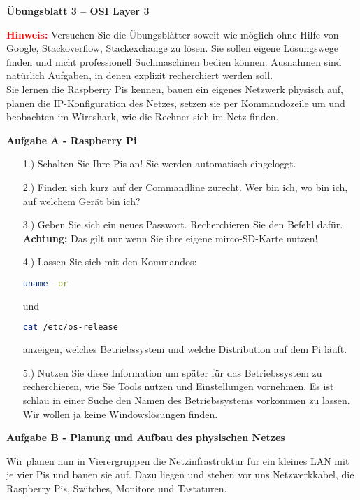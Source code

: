 \documentclass[paper=a4,fontsize=11pt]{scrartcl}%
\numberwithin{equation}{section}
\begin{document}
\begin{center} \Large{\textbf{Übungsblatt 3 -- OSI Layer 3}}\end{center}
\large{\textbf{\textcolor{red}{Hinweis:}}} Versuchen Sie die Übungsblätter soweit wie möglich ohne Hilfe von Google, Stackoverflow, Stackexchange zu lösen. Sie sollen eigene Lösungswege finden und nicht professionell Suchmaschinen bedien können. Ausnahmen sind natürlich Aufgaben, in denen explizit recherchiert werden soll.\\
Sie lernen die Raspberry Pis kennen, bauen ein eigenes Netzwerk physisch auf, planen die IP-Konfiguration des Netzes, setzen sie per Kommandozeile um und beobachten im Wireshark, wie die Rechner sich im Netz finden.
\vskip0.5in

\begin{center}\Large{\textbf{Aufgabe A - Raspberry Pi}}\end{center}\vskip0.25in

\begin{itemize}
	\item[1.)] Schalten Sie Ihre Pis an! Sie werden automatisch eingeloggt.
	\item[2.)] Finden sich kurz auf der Commandline zurecht. \glqq Wer bin ich, wo bin ich, auf welchem Gerät bin ich?\grqq
	\item[3.)] Geben Sie sich ein neues Passwort. Recherchieren Sie den Befehl dafür. \textbf{Achtung:} Das gilt nur wenn Sie ihre eigene mirco-SD-Karte nutzen!
	\item[4.)] Lassen Sie sich mit den Kommandos:
			\begin{lstlisting}[style=Bash, language=Bash]
uname -or
		\end{lstlisting} und
				\begin{lstlisting}[style=Bash, language=Bash]
cat /etc/os-release
		\end{lstlisting} anzeigen, welches Betriebssystem und welche Distribution auf dem Pi läuft.
	\item[5.)] Nutzen Sie diese Information um später für das Betriebssystem zu recherchieren, wie Sie Tools nutzen und Einstellungen vornehmen. Es ist schlau in einer Suche den Namen des Betriebssystems vorkommen zu lassen. Wir wollen ja keine Windowslösungen finden.
\end{itemize}
\vskip0.5in



\begin{center}\Large{\textbf{Aufgabe B - Planung und Aufbau des physischen Netzes}}\end{center}\vskip0.25in
Wir planen nun in Vierergruppen die Netzinfrastruktur für ein kleines LAN mit je vier Pis und bauen sie auf. Dazu liegen und stehen vor uns Netzwerkkabel, die Raspberry Pis, Switches, Monitore und Tastaturen.
\end{document}
